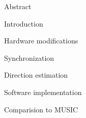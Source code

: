 

\usepackage{antropy_en}


  \anttitle

  \begin{topchapter}{Abstract}
    
  \end{topchapter}

  \begin{topchapter}{Introduction}
    
  \end{topchapter}

  \begin{topchapter}{Hardware modifications}
    
  \end{topchapter}

  \begin{topchapter}{Synchronization}
    
  \end{topchapter}

  \begin{topchapter}{Direction estimation}
    
  \end{topchapter}

  \begin{topchapter}{Software implementation}
    
  \end{topchapter}

  \begin{topchapter}{Comparision to MUSIC}
    
  \end{topchapter}

